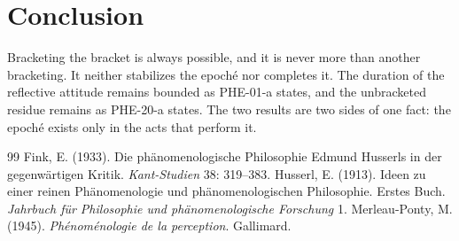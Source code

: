 \documentclass{situationist-preprint}
\begin{document}
\section{Conclusion}

Bracketing the bracket is always possible, and it is never more than another bracketing. It neither stabilizes the epoché nor completes it. The duration of the reflective attitude remains bounded as PHE-01-a states, and the unbracketed residue remains as PHE-20-a states. The two results are two sides of one fact: the epoché exists only in the acts that perform it.

\begin{thebibliography}{99}\small
{} Fink, E. (1933). Die phänomenologische Philosophie Edmund Husserls in der gegenwärtigen Kritik. \emph{Kant-Studien} 38: 319--383.
 Husserl, E. (1913). Ideen zu einer reinen Phänomenologie und phänomenologischen Philosophie. Erstes Buch. \emph{Jahrbuch für Philosophie und phänomenologische Forschung} 1.
 Merleau-Ponty, M. (1945). \emph{Phénoménologie de la perception}. Gallimard.
\end{thebibliography}
\end{document}
